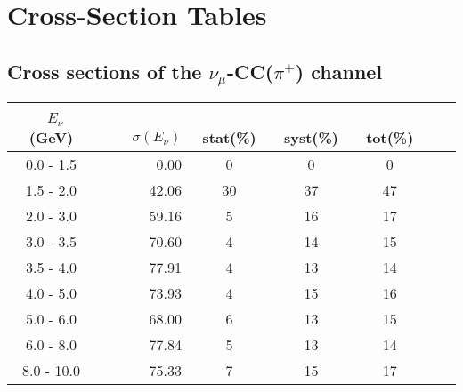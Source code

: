 \documentclass[aps, prd, reprint,showpacs,  preprintnumbers,amsmath,amssymb,superscriptaddress, nofootinbib]{revtex4-1}
\makeatletter
\newcommand{\numu}{\mbox{$\nu_{\mu}$}}                   %
\renewenvironment{table}
  {\def\@captype{table}}
  {}
\makeatother
\begin{document}
\section{Cross-Section Tables}


\subsection{Cross sections of the $\numu$-CC($\pi^{+}$) channel}

\begin{table}
\centering
\begin{tabular}{crccccc}
\hline
~$E_{\nu}$ (GeV) &~~~ $\sigma (E_\nu)$ &~ stat(\%) &~ syst(\%) &~ tot(\%)  \\
\hline
 0.0 -  1.5 &   0.00 &    0 &    0 &    0 \\
 1.5 -  2.0 &  42.06 &   30 &   37 &   47 \\
 2.0 -  3.0 &  59.16 &    5 &   16 &   17 \\
 3.0 -  3.5 &  70.60 &    4 &   14 &   15 \\
 3.5 -  4.0 &  77.91 &    4 &   13 &   14 \\
 4.0 -  5.0 &  73.93 &    4 &   15 &   16 \\
 5.0 -  6.0 &  68.00 &    6 &   13 &   15 \\
 6.0 -  8.0 &  77.84 &    5 &   13 &   14 \\
 8.0 - 10.0 &  75.33 &    7 &   15 &   17 \\
\hline\hline
\end{tabular}
\caption{ Total cross section in neutrino energy $E_\nu$, $\sigma (E_\nu)(10^{-40}\text{cm}^2/\text{nucleon})$, 
for N$\pi^+$ production with statistical (stat), systematic (syst), and total (tot) uncertainties.}
\label{tb:pipEnu}
\end{table}
\vskip 10pt
\end{document}
